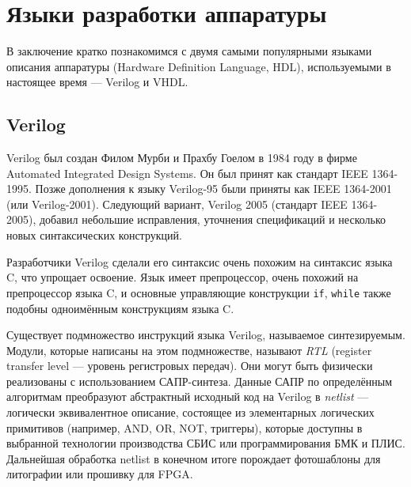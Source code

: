 

\section{Языки разработки аппаратуры}

В заключение кратко познакомимся с двумя самыми популярными языками описания аппаратуры (\abbr Hardware Definition Language, HDL), используемыми в настоящее время — Verilog и VHDL.

\subsection{Verilog}
 
Verilog был создан Филом Мурби и Прахбу Гоелом в  1984 году в фирме Auto\-mated In\-te\-gra\-ted De\-sign Sys\-tems. Он был принят как стандарт IEEE 1364-1995. Позже дополнения к языку Verilog-95 были приняты как IEEE 1364-2001 (или Veri\-log-2001). Следующий вариант, Verilog 2005 (стандарт IEEE 1364-2005), добавил небольшие исправления, уточнения спецификаций и несколько новых синтаксических конструкций.

Разработчики Verilog сделали его синтаксис очень похожим на синтаксис языка C, что упрощает освоение. Язык имеет препроцессор, очень похожий на препроцессор языка C, и основные управляющие конструкции \texttt{if}, \texttt{while} также подобны одноимённым конструкциям языка C. 

Существует подмножество инструкций языка Verilog, называемое синтезируемым. Модули, которые написаны на этом подмножестве, называют \textit{RTL} (\abbr register transfer level — уровень регистровых передач). Они могут быть физически реализованы с использованием САПР-синтеза. Данные САПР по определённым алгоритмам преобразуют абстрактный исходный код на Verilog в \emph{netlist} — логически эквивалентное описание, состоящее из элементарных логических примитивов (например, AND, OR, NOT, триггеры), которые доступны в выбранной технологии производства СБИС или программирования БМК и ПЛИС. Дальнейшая обработка netlist в конечном итоге порождает фотошаблоны для литографии или прошивку для FPGA.

